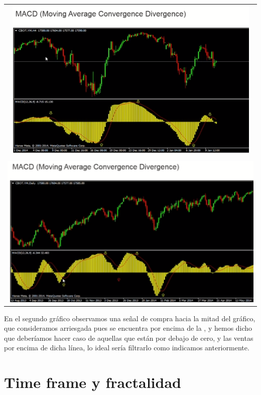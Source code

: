 \begin{center}
    \begin{tabular}{ c }
        \includegraphics[scale=.80]{images/MACD-01.png} \\
        \\
        \includegraphics[scale=.80]{images/MACD-02.png}
        
    \end{tabular}
\end{center}

En el segundo gráfico observamos una señal de compra hacia la mitad del gráfico, que consideramos arriesgada pues se encuentra por encima de la , y hemos dicho que deberíamos hacer caso de aquellas que están por debajo de cero, y las ventas por encima de dicha línea, lo ideal sería filtrarlo como indicamos anteriormente.

\section{Time frame y fractalidad}


